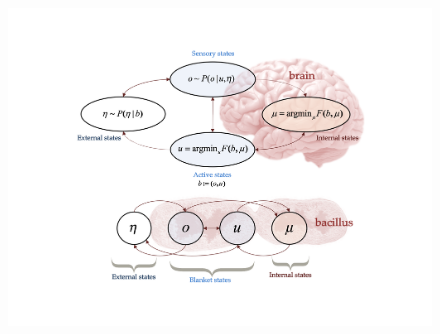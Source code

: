 \documentclass{article}
\begin{document}
\begin{figure}
    \centering
    \includegraphics[width=\textwidth]{FigureMarkovblanket.png}

\end{figure}
\end{document}
